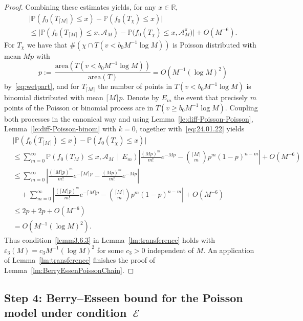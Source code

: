 \documentclass[AHL,Unicode,longabstracts,published]{cedram}
\newcommand{\bbR}{\mathbb{R}}
\newcommand{\bbP}{\mathbb{P}}
\newcommand{\clA}{\mathcal{A}}
\newcommand{\clE}{\mathcal{E}}
\newcommand{\area}{\mathrm{area}}
\begin{document}
\begin{proof}
Combining these estimates yields, for any $x\in\bbR$,
\begin{multline}\label{eq:24.01.22}
\big|\bbP\left(f_0\left(T_{\lceil M \rceil}\right)\leq x\right)-  \bbP\left(f_0\left(T_{\chi}\right)\leq x\right)\big|
\\ \leq 
\big|\bbP\left(f_0\left(T_{\lceil M \rceil}\right)\leq x, \clA_M\right)-\bbP\big(f_0\left(T_{\chi}\right)\leq x, \clA^\pi_{M}\big)\big| + O\left(M^{-6}\right).
\end{multline}
For $T_\chi$ we have that $\#(\chi \cap T(v< b_0 M^{-1} \log M))$ is Poisson distributed with mean $Mp$ with
\[
p := \, \frac{{\area}\left(T(v< b_0 M^{-1} \log M)\right)}{{\area}(T)} = O\left(M^{-1} (\log M)^2\right)
\]
by~\eqref{eq:wetpart}, and for $T_{\lceil M \rceil}$ the number of points in $T(v< b_0 M^{-1} \log M)$ is binomial distributed with mean $\lceil M \rceil p$. Denote by $E_m$ the event that precisely $m$ points of the Poisson or binomial process are in $T(v\ge b_0 M^{-1} \log M)$. Coupling both processes in the canonical way and using Lemma~\ref{le:diff-Poisson-Poisson}, Lemma~\ref{le:diff-Poisson-binom} with $k=0$, together with~\eqref{eq:24.01.22} yields
\begin{align*}
& \big| \bbP\left(f_0\left(T_{\lceil M \rceil}\right) \leq x\right)- \bbP\left(f_0(T_{\chi})\leq x\right)\big|
\\ & \leq
\sum_{m=0}^\infty \bbP\left(f_0(T_M)\leq x, \clA_M \,\middle|\, E_m\right)\left| \frac{(Mp)^m}{m!} e^{- Mp} - \binom{\lceil M \rceil}{m} p^m (1-p)^{n-m} \right| + O\left(M^{-6}\right)
\\
& \leq
\sum_{m=0}^\infty \left| \frac{(\lceil M \rceil p)^m}{m!} e^{- \lceil M \rceil p} - \frac{(M p)^m}{m!} e^{- M p} \right|
\\ & \quad + \sum_{m=0}^\infty \left| \frac{(\lceil M \rceil p)^m}{m!} e^{- \lceil M \rceil p} - \binom{\lceil M \rceil}{m} p^m (1-p)^{n-m} \right| + O\left(M^{-6}\right)
\\ & \leq 2p + 2p + O\left(M^{-6}\right)\\
& = O\left(M^{-1} (\log M)^2\right).
\end{align*}
Thus condition~\eqref{lemm3.6.3} in Lemma~\ref{lm:transference} holds with $\varepsilon_3(M)=c_3 M^{-1} (\log M)^2$ for some $c_3>0$ independent of $M$. An application of Lemma~\ref{lm:transference} finishes the proof of Lemma~\ref{lm:BerryEssenPoissonChain}.
\end{proof}



\subsection{Step 4: Berry--Esseen bound for the Poisson model under condition~\texorpdfstring{$\clE$}{E}}\label{step4}
\end{document}
